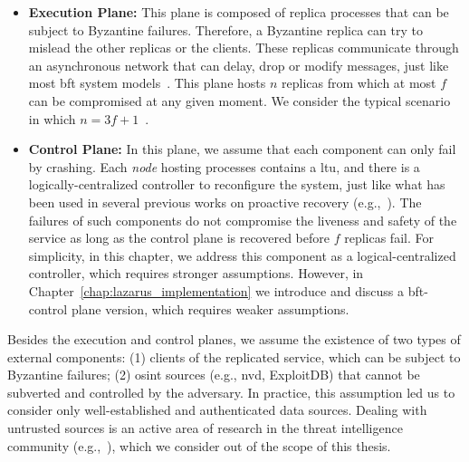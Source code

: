 \begin{itemize}

\item \textbf{Execution Plane:} 
This plane is composed of replica processes that can be subject to Byzantine failures.
Therefore, a Byzantine replica can try to mislead the other replicas or the clients.
These replicas communicate through an asynchronous network that can delay, drop or modify messages, just like most \gls{bft} system models~\cite{Castro:2002,Kotla:2010,Bessani:2014,Aublin:2015}.
This plane hosts $n$ replicas from which at most $f$ can be compromised at any given moment.
We consider the typical scenario in which $n=3f+1$~\cite{Castro:2002,Bessani:2008,Moniz:2011,Kotla:2010,Aublin:2015}.  

\item \textbf{Control Plane:}  
In this plane, we assume that each component can only fail by crashing. 
Each \emph{node} hosting processes contains a \gls{ltu}, and there is a logically-centralized controller to reconfigure the system, just like what has been used in several previous works on proactive recovery (e.g.,~\cite{Roeder:2010,Platania:2014,Sousa:2010}).
The failures of such components do not compromise the liveness and safety of the service as long as the control plane is recovered before $f$ replicas fail.
For simplicity, in this chapter, we address this component as a logical-centralized controller, which requires stronger assumptions. 
However, in Chapter~\ref{chap:lazarus_implementation} we introduce and discuss a \gls{bft}-control plane version, which requires weaker assumptions.


\end{itemize}

Besides the execution and control planes, we assume the existence of two types of external components: (1) clients of the replicated service, which can be subject to Byzantine failures; (2) \gls{osint} sources (e.g., \gls{nvd}, ExploitDB) that cannot be subverted and controlled by the adversary.
In practice, this assumption led us to consider only well-established and authenticated data sources.
Dealing with untrusted sources is an active area of research in the threat intelligence community (e.g.,~\cite{Sabottke:2015,Liu:2015}), which we consider out of the scope of this thesis.




